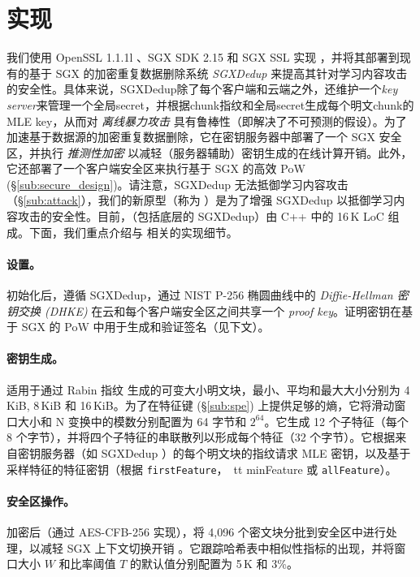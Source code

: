 \section{实现}
\label{sec:implementation}
我们使用 OpenSSL 1.1.1l \cite{openssl}、SGX SDK 2.15 \cite{sgxsdk} 和 SGX SSL \cite{sgxssl} 实现 \sysnameF，并将其部署到现有的基于 SGX 的加密重复数据删除系统 {\em SGXDedup} \cite{ren21} 来提高其针对学习内容攻击的安全性。具体来说，SGXDedup除了每个客户端和云端之外，还维护一个{\em key server}来管理一个全局secret，并根据chunk指纹和全局secret生成每个明文chunk的MLE key，从而对 {\em 离线暴力攻击} 具有鲁棒性（即解决了不可预测的假设）\cite{bellare13b}。为了加速基于数据源的加密重复数据删除，它在密钥服务器中部署了一个 SGX 安全区，并执行 {\em 推测性加密} \cite{eduardo19} 以减轻（服务器辅助）密钥生成的在线计算开销。此外，它还部署了一个客户端安全区来执行基于 SGX 的高效 PoW (\S\ref{sub:secure_design})。请注意，SGXDedup 无法抵御学习内容攻击（\S\ref{sub:attack}），我们的新原型（称为 \prototype）是为了增强 SGXDedup 以抵御学习内容攻击的安全性。目前，\prototype（包括底层的 SGXDedup）由 C++ 中的 16\,K LoC 组成。下面，我们重点介绍与 \prototype 相关的实现细节。


\paragraph{设置。}
初始化后，\prototype 遵循 SGXDedup，通过 NIST P-256 椭圆曲线中的 {\em Diffie-Hellman 密钥交换 (DHKE)} 在云和每个客户端安全区之间共享一个 {\em proof key}。证明密钥在基于 SGX 的 PoW 中用于生成和验证签名（见下文）。


\paragraph{密钥生成。}
\prototype 适用于通过 Rabin 指纹 \cite{rabin81} 生成的可变大小明文块，最小、平均和最大大小分别为 4\,KiB, 8\,KiB 和 16\,KiB。为了在特征键 (\S\ref{sub:spe}) 上提供足够的熵，它将滑动窗口大小和 N 变换中的模数分别配置为 64 字节和 $2^{64}$。它生成 12 个子特征（每个 8 个字节），并将四个子特征的串联散列以形成每个特征（32 个字节）。它根据来自密钥服务器（如 SGXDedup \cite{ren21}）的每个明文块的指纹请求 MLE 密钥，以及基于采样特征的特征密钥（根据 {\tt firstFeature}，{\ tt minFeature} 或 {\tt allFeature}）。


\paragraph{安全区操作。}
加密后（通过 AES-CFB-256 实现），\prototype 将 4,096 个密文块分批到安全区中进行处理，以减轻 SGX 上下文切换开销 \cite{arnautov16}。它跟踪哈希表中相似性指标的出现，并将窗口大小 $W$ 和比率阈值 $T$ 的默认值分别配置为 5\,K 和 3\%。

